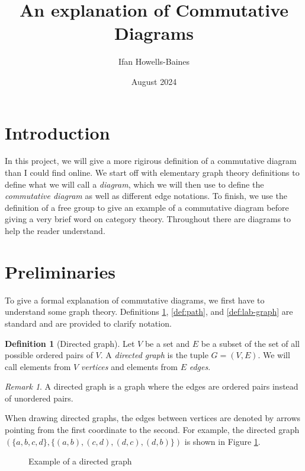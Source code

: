 \documentclass[12pt]{article}
\title{An explanation of Commutative Diagrams}
\author{Ifan Howells-Baines}
\date{August 2024}
\theoremstyle{definition}
\newtheorem{definition}{Definition}
\theoremstyle{remark}
\newtheorem*{remark}{Remark}
\begin{document}
\maketitle

\section{Introduction}
\label{sec:intro}

In this project, we will give a more rigirous definition of a commutative diagram than I could find online. We start off with elementary graph theory definitions to define what we will call a \textit{diagram}, which we will then use to define the \textit{commutative diagram} as well as different edge notations. To finish, we use the definition of a free group to give an example of a commutative diagram before giving a very brief word on category theory. Throughout there are diagrams to help the reader understand.

\section{Preliminaries}
\label{sec:prelim}

To give a formal explanation of commutative diagrams, we first have to understand some graph theory. Definitions \ref{def:dir-graph}, \ref{def:path}, and \ref{def:lab-graph} are standard and are provided to clarify notation.

\begin{definition}[Directed graph]
  \label{def:dir-graph}
  Let $V$ be a set and $E$ be a subset of the set of all possible ordered pairs of $V$. A \textit{directed graph} is the tuple $G=(V,E)$. We will call elements from $V$ \textit{vertices} and elements from $E$ \textit{edges}.
\end{definition}

\begin{remark}
  A directed graph is a graph where the edges are ordered pairs instead of unordered pairs.
\end{remark}

When drawing directed graphs, the edges between vertices are denoted by arrows pointing from the first coordinate to the second. For example, the directed graph $(\{a,b,c,d\},\{(a,b),(c,d),(d,c),(d,b)\})$ is shown in Figure \ref{fig:dir-graph}.

\begin{figure}[h]
  \centering
  \caption{Example of a directed graph}
  \label{fig:dir-graph}
\end{figure}
\end{document}
